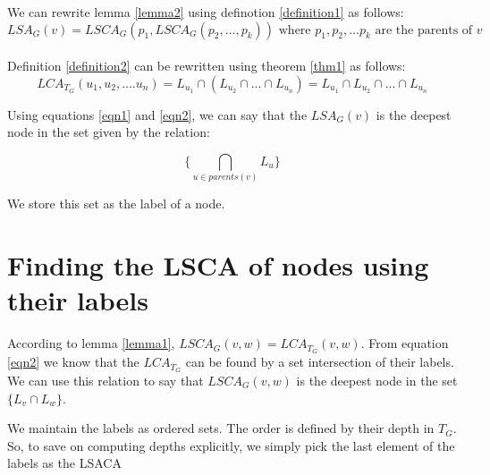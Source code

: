 \documentclass{paper}
\begin{document}
We can rewrite lemma \ref{lemma2} using definotion \ref{definition1} as follows:
\begin{equation}\label{eqn1}
LSA_G(v) = LSCA_G (p_1, LSCA_G (p_2,...,p_k))
\text{ where } p_1, p_2, ... p_k \text{ are the parents of } v
\end{equation} \\

Definition \ref{definition2} can be rewritten using theorem \ref{thm1} as follows:
\begin{equation}\label{eqn2}
	LCA_{T_G} (u_1, u_2, .... u_n) = L_{u_1} \cap (L_{u_2} \cap ... \cap L_{u_n}) = L_{u_1} \cap L_{u_2} \cap ... \cap L_{u_n}
\end{equation}


Using equations \ref{eqn1} and \ref{eqn2}, we can say that the $LSA_G(v)$ is the deepest node in the set given by the relation:

\[
\{ \bigcap_{u\in parents(v)} L_u\}
\]


We store this set as the label of a node.

\section{Finding the LSCA of nodes using their labels}

According to lemma \ref{lemma1}, $LSCA_G(v,w) = LCA_{T_G}(v,w)$. From equation \ref{eqn2} we know that the $LCA_{T_G}$ can be found by a set intersection of their labels. We can use this relation to say that $LSCA_G(v,w)$ is the deepest node in the set $\{L_v \cap L_w\}$.

We maintain the labels as ordered sets. The order is defined by their depth in $T_G$. So, to save on computing depths explicitly, we simply pick the last element of the labels as the LSACA
\end{document}

